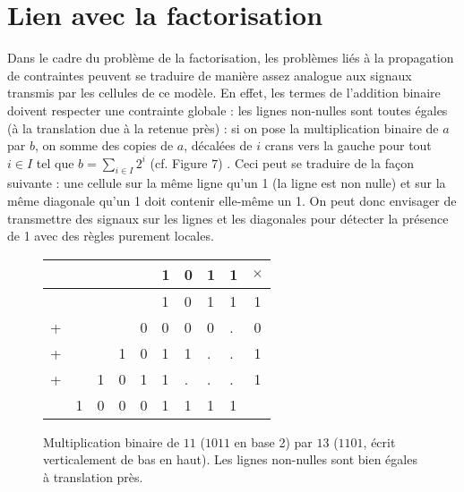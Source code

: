 \documentclass[11pt, openany]{article}
\begin{document}
\section*{Lien avec la factorisation}

Dans le cadre du problème de la factorisation, les problèmes liés à la propagation de contraintes peuvent se traduire de manière assez analogue aux signaux transmis par les cellules de ce modèle. En effet, les termes de l'addition binaire doivent respecter une contrainte globale : les lignes non-nulles sont toutes égales (à la translation due à la retenue près) : si on pose la multiplication binaire de $a$ par $b$, on somme des copies de $a$, décalées de $i$ crans vers la gauche pour tout $i\in I$ tel que $b = \sum_{i\in I}2^i$ (cf. Figure $7$) . Ceci peut se traduire de la façon suivante : une cellule sur la même ligne qu'un 1 (la ligne est non nulle) et sur la même diagonale qu'un 1 doit contenir elle-même un 1. On peut donc envisager de transmettre des signaux sur les lignes et les diagonales pour détecter la présence de 1 avec des règles purement locales. 

\begin{figure}
\centering
\begin{tabular}{lllllllll|c}
&&&&&1&0&1&1&$\times$\\
\hline
&&&&&1&0&1&1&1\\
+&&&&0&0&0&0&.&0 \\
+&&&1&0&1&1&.&.&1\\
+&&1&0&1&1&.&.&.&1\\
\hline
&1&0&0&0&1&1&1&1&\\
\end{tabular}
\caption{Multiplication binaire de $11$ ($1011$ en base 2) par $13$ ($1101$, écrit verticalement de bas en haut). Les lignes non-nulles sont bien égales à translation près.}
\end{figure}
\end{document}
